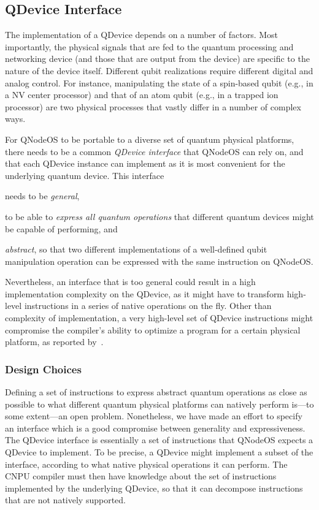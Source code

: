 \subsection{QDevice Interface}
\label{qnodeos:sec:appendix-qdevice}

The implementation of a \ac{QDevice} depends on a number of factors. Most importantly, the physical signals that are fed to the quantum processing and networking device (and those that are output from the device) are specific to the nature of the device itself. Different qubit realizations require different digital and analog control. For instance, manipulating the state of a spin-based qubit (e.g., in a \ac{NV} center processor) and that of an atom qubit (e.g., in a trapped ion processor) are two physical processes that vastly differ in a number of complex ways.

For \ac{QNodeOS} to be portable to a diverse set of quantum physical platforms, there needs to be a common \emph{\ac{QDevice} interface} that \ac{QNodeOS} can rely on, and that each \ac{QDevice} instance can implement as it is most convenient for the underlying quantum device. This interface \begin{inlinelist} \item needs to be \emph{general}, \item to be able to \emph{express all quantum operations} that different quantum devices might be capable of performing, and \item \emph{abstract}, so that two different implementations of a well-defined qubit manipulation operation can be expressed with the same instruction on \ac{QNodeOS}.\end{inlinelist} Nevertheless, an interface that is too general could result in a high implementation complexity on the \ac{QDevice}, as it might have to transform high-level instructions in a series of native operations on the fly. Other than complexity of implementation, a very high-level set of \ac{QDevice} instructions might compromise the compiler's ability to optimize a program for a certain physical platform, as reported by~\textcite{murali_2019_fullstack}.

\subsubsection{Design Choices}

Defining a set of instructions to express abstract quantum operations as close as possible to what different quantum physical platforms can natively perform is---to some extent---an open problem. Nonetheless, we have made an effort to specify an interface which is a good compromise between generality and expressiveness. The \ac{QDevice} interface is essentially a set of instructions that \ac{QNodeOS} expects a \ac{QDevice} to implement. To be precise, a \ac{QDevice} might implement a subset of the interface, according to what native physical operations it can perform. The CNPU compiler must then have knowledge about the set of instructions implemented by the underlying \ac{QDevice}, so that it can decompose instructions that are not natively supported.

